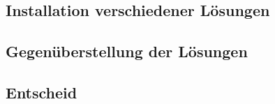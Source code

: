 \subsection{Installation verschiedener Lösungen}


\subsection{Gegenüberstellung der Lösungen}

\subsection{Entscheid}